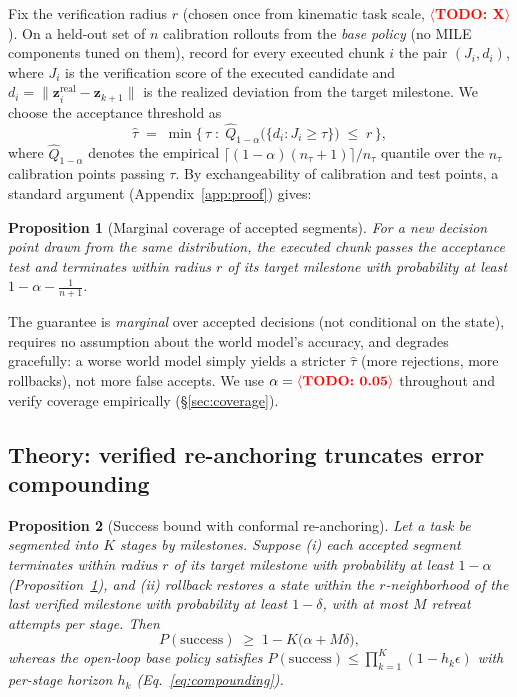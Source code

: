 \documentclass{article}
\newcommand{\mile}{\textsc{MILE}}
\newcommand{\TODO}[1]{\textcolor{red}{\textbf{$\langle$TODO: #1$\rangle$}}}
\newcommand{\z}{\mathbf{z}}
\newtheorem{proposition}{Proposition}
\begin{document}
Fix the verification radius $r$ (chosen once from kinematic task scale, \TODO{X}). On a held-out set of $n$ calibration rollouts from the \emph{base policy} (no \mile{} components tuned on them), record for every executed chunk $i$ the pair $(J_i, d_i)$, where $J_i$ is the verification score of the executed candidate and $d_i = \|\z^{\mathrm{real}}_i - \z_{k+1}\|$ is the realized deviation from the target milestone. We choose the acceptance threshold as
\begin{equation}
\hat{\tau} \;=\; \min\Big\{\, \tau \;:\; \widehat{Q}_{1-\alpha}\big(\{ d_i : J_i \ge \tau \}\big) \;\le\; r \,\Big\},
\label{eq:conformal}
\end{equation}
where $\widehat{Q}_{1-\alpha}$ denotes the empirical $\lceil (1-\alpha)(n_\tau + 1) \rceil / n_\tau$ quantile over the $n_\tau$ calibration points passing $\tau$. By exchangeability of calibration and test points, a standard argument (Appendix~\ref{app:proof}) gives:

\begin{proposition}[Marginal coverage of accepted segments]
\label{prop:coverage}
For a new decision point drawn from the same distribution, the executed chunk passes the acceptance test and terminates within radius $r$ of its target milestone with probability at least $1 - \alpha - \frac{1}{n+1}$.
\end{proposition}

The guarantee is \emph{marginal} over accepted decisions (not conditional on the state), requires no assumption about the world model's accuracy, and degrades gracefully: a worse world model simply yields a stricter $\hat{\tau}$ (more rejections, more rollbacks), not more false accepts. We use $\alpha = \TODO{0.05}$ throughout and verify coverage empirically (\S\ref{sec:coverage}).

\subsection{Theory: verified re-anchoring truncates error compounding}
\label{sec:theory}

\begin{proposition}[Success bound with conformal re-anchoring]
\label{prop:main}
Let a task be segmented into $K$ stages by milestones. Suppose (i) each accepted segment terminates within radius $r$ of its target milestone with probability at least $1-\alpha$ (Proposition~\ref{prop:coverage}), and (ii) rollback restores a state within the $r$-neighborhood of the last verified milestone with probability at least $1-\delta$, with at most $M$ retreat attempts per stage. Then
\begin{equation}
P(\mathrm{success}) \;\ge\; 1 - K\big(\alpha + M\delta\big),
\end{equation}
whereas the open-loop base policy satisfies $P(\mathrm{success}) \le \prod_{k=1}^{K}(1 - h_k \epsilon)$ with per-stage horizon $h_k$ (Eq.~\ref{eq:compounding}).
\end{proposition}
\end{document}
